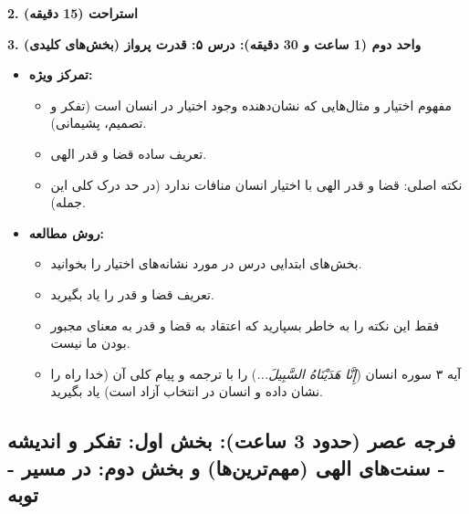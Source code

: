 \documentclass[12pt,a4paper]{article}
\newcommand{\quranverse}[1]{\textit{#1}}
\newcommand{\sectionbreak}{\noindent\hrulefill\par\vspace{0.5em}}
\begin{document}
\textbf{2. استراحت (15 دقیقه)}
\vspace{0.5em}

\textbf{3. واحد دوم (1 ساعت و 30 دقیقه): درس ۵: قدرت پرواز (بخش‌های کلیدی)}
\begin{itemize}
    \item \textbf{تمرکز ویژه:}
    \begin{itemize}
        \item مفهوم اختیار و مثال‌هایی که نشان‌دهنده وجود اختیار در انسان است (تفکر و تصمیم، پشیمانی).
        \item تعریف ساده قضا و قدر الهی.
        \item نکته اصلی: قضا و قدر الهی با اختیار انسان منافات ندارد (در حد درک کلی این جمله).
    \end{itemize}
    \item \textbf{روش مطالعه:}
    \begin{itemize}
        \item بخش‌های ابتدایی درس در مورد نشانه‌های اختیار را بخوانید.
        \item تعریف قضا و قدر را یاد بگیرید.
        \item فقط این نکته را به خاطر بسپارید که اعتقاد به قضا و قدر به معنای مجبور بودن ما نیست.
        \item آیه ۳ سوره انسان (\quranverse{إِنَّا هَدَیْنَاهُ السَّبِیلَ...}) را با ترجمه و پیام کلی آن (خدا راه را نشان داده و انسان در انتخاب آزاد است) یاد بگیرید.
    \end{itemize}
\end{itemize}

\sectionbreak
\vspace{1em}

\subsection*{فرجه عصر (حدود 3 ساعت): بخش اول: تفکر و اندیشه - سنت‌های الهی (مهم‌ترین‌ها) و بخش دوم: در مسیر - توبه}
\end{document}
